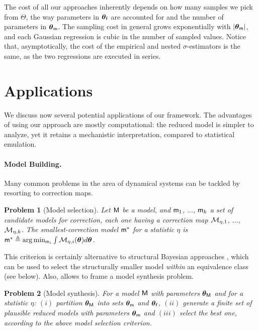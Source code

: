 \documentclass[runningheads,a4paper]{llncs}
\newtheorem{myprob}{Problem}
\newcommand{\bM}{{\sf{M}}}
\newcommand{\bm}{{\sf{m}}}
\newcommand{\pfpar}{\bth_{\sf{f}}}
\newcommand{\pmpar}{\bth_{\sf{m}}}
\newcommand{\pMpar}{\bth_{\sf{M}}}
\newcommand{\tstat}{\eta} %
\newcommand{\bth}{\boldsymbol{\theta}}
\newcommand{\tmapi}[1]{{\cal M}_{\tstat,#1}}
\begin{document}
The cost of all  our approaches  inherently depends on how many samples we pick from $\Theta$, the way parameters in $\pfpar$ are accounted for and the number of parameters in $\pmpar$. The sampling cost in general grows exponentially with $|\pmpar|$, and each Gaussian regression is cubic in the number of sampled values. Notice that, asymptotically, the cost of the empirical and nested $\sigma$-estimators is the same,  as the two regressions are executed in series. 





\section{Applications}
\label{sec:applications}


We discuss now several potential applications of our framework. The advantages of using our approach are mostly computational: the reduced model is simpler to analyze, yet it retains a mechanistic interpretation, compared to statistical emulation. 
\paragraph{Model Building.} 
Many common problems in the area of dynamical systems can be tackled by resorting to correction maps. 
\begin{myprob}[Model selection]  Let $\bM$ be a model, and $\bm_1$, $\ldots$, $\bm_k$ a set of candidate models for correction, each one having a correction map $\tmapi{1}$, $\ldots$, $\tmapi{k}$.  The smallest-correction model $\bm^\ast$  for a statistic $\tstat$  is
$ \bm^\ast \triangleq \arg\min_{\bm_i} \int \tmapi{i}(\boldsymbol{\theta}) d\boldsymbol{\theta}$.
\end{myprob}
This criterion is certainly alternative to structural Bayesian approaches \cite{barber2012}, which can be used to select the structurally smaller model {\em within} an equivalence class (see below). Also, allows to frame a model synthesis problem.

\begin{myprob}[Model synthesis] For a model $\bM$ with parameters $\pMpar$ and for a statistic $\tstat$: $(i)$  partition $\pMpar$ into sets $\pmpar$ and $\pfpar$,  $(ii)$ generate a finite set of plausible reduced models with parameters $\pmpar$ and  $(iii)$ select the best one, according to the above model selection criterion.
\end{myprob}
\end{document}

